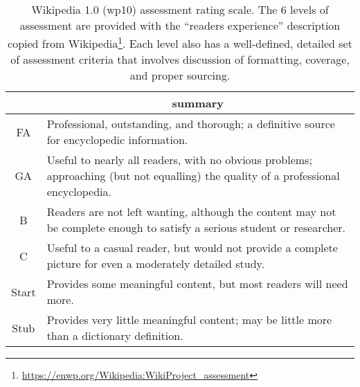 \begin{table}
\centering
\caption{Wikipedia 1.0 (wp10) assessment rating scale. The 6 levels of assessment are provided with the ``readers experience'' description copied from Wikipedia\protect\footnote{\url{https://enwp.org/Wikipedia:WikiProject_assessment}}.  Each level also has a well-defined, detailed set of assessment criteria that involves discussion of formatting, coverage, and proper sourcing.}
\begin{tabular}{|c|p{7cm}|} \hline
& \multicolumn{1}{|c|}{summary} \\
\hline
FA & Professional, outstanding, and thorough; a definitive source for
encyclopedic information.\\ \hline
GA & Useful to nearly all readers, with no obvious problems; approaching
(but not equalling) the quality of a professional
encyclopedia.\\ \hline
B & Readers are not left wanting, although the content may not be
complete enough to satisfy a serious student or
researcher.\\ \hline
C & Useful to a casual reader, but would not provide a complete picture
for even a moderately detailed study.\\ \hline
Start & Provides some meaningful content, but most readers will need
more.\\ \hline
Stub & Provides very little meaningful content; may be little more than
a dictionary definition.\\ \hline
\end{tabular}
\label{tab:assessment_scale}
\end{table}
